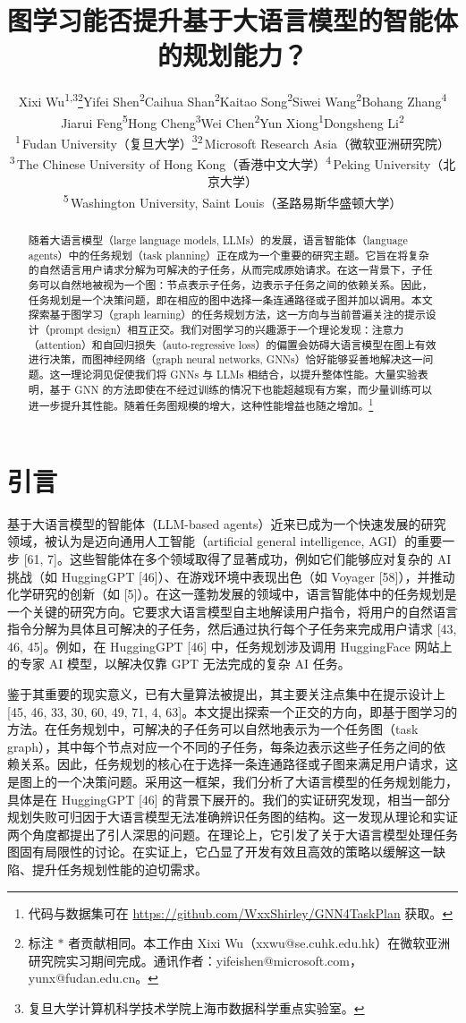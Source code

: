 \documentclass[11pt,UTF8,fontset=fandol]{ctexart}
\title{\textbf{图学习能否提升基于大语言模型的智能体的规划能力？}}
\author{Xixi Wu\textsuperscript{1,3}\thanks{标注 $*$ 者贡献相同。本工作由 Xixi Wu（xxwu@se.cuhk.edu.hk）在微软亚洲研究院实习期间完成。通讯作者：yifeishen@microsoft.com，yunx@fudan.edu.cn。}\quad Yifei Shen\textsuperscript{2}\quad Caihua Shan\textsuperscript{2}\quad Kaitao Song\textsuperscript{2}\quad Siwei Wang\textsuperscript{2}\quad Bohang Zhang\textsuperscript{4}\\
Jiarui Feng\textsuperscript{5}\quad Hong Cheng\textsuperscript{3}\quad Wei Chen\textsuperscript{2}\quad Yun Xiong\textsuperscript{1}\quad Dongsheng Li\textsuperscript{2}\\[0.6em]
\textsuperscript{1}\,Fudan University（复旦大学）\thanks{复旦大学计算机科学技术学院上海市数据科学重点实验室。}\quad \textsuperscript{2}\,Microsoft Research Asia（微软亚洲研究院）\\
\textsuperscript{3}\,The Chinese University of Hong Kong（香港中文大学）\quad \textsuperscript{4}\,Peking University（北京大学）\\
\textsuperscript{5}\,Washington University, Saint Louis（圣路易斯华盛顿大学）}
\date{}
\begin{document}
\maketitle

\begin{abstract}
随着大语言模型（large language models, LLMs）的发展，语言智能体（language agents）中的任务规划（task planning）正在成为一个重要的研究主题。它旨在将复杂的自然语言用户请求分解为可解决的子任务，从而完成原始请求。在这一背景下，子任务可以自然地被视为一个图：节点表示子任务，边表示子任务之间的依赖关系。因此，任务规划是一个决策问题，即在相应的图中选择一条连通路径或子图并加以调用。本文探索基于图学习（graph learning）的任务规划方法，这一方向与当前普遍关注的提示设计（prompt design）相互正交。我们对图学习的兴趣源于一个理论发现：注意力（attention）和自回归损失（auto-regressive loss）的偏置会妨碍大语言模型在图上有效进行决策，而图神经网络（graph neural networks, GNNs）恰好能够妥善地解决这一问题。这一理论洞见促使我们将 GNNs 与 LLMs 相结合，以提升整体性能。大量实验表明，基于 GNN 的方法即使在不经过训练的情况下也能超越现有方案，而少量训练可以进一步提升其性能。随着任务图规模的增大，这种性能增益也随之增加。\footnote{代码与数据集可在 \url{https://github.com/WxxShirley/GNN4TaskPlan} 获取。}
\end{abstract}

\section{引言}

基于大语言模型的智能体（LLM-based agents）近来已成为一个快速发展的研究领域，被认为是迈向通用人工智能（artificial general intelligence, AGI）的重要一步 [61, 7]。这些智能体在多个领域取得了显著成功，例如它们能够应对复杂的 AI 挑战（如 HuggingGPT [46]）、在游戏环境中表现出色（如 Voyager [58]），并推动化学研究的创新（如 [5]）。在这一蓬勃发展的领域中，语言智能体中的任务规划是一个关键的研究方向。它要求大语言模型自主地解读用户指令，将用户的自然语言指令分解为具体且可解决的子任务，然后通过执行每个子任务来完成用户请求 [43, 46, 45]。例如，在 HuggingGPT [46] 中，任务规划涉及调用 HuggingFace 网站上的专家 AI 模型，以解决仅靠 GPT 无法完成的复杂 AI 任务。

鉴于其重要的现实意义，已有大量算法被提出，其主要关注点集中在提示设计上 [45, 46, 33, 30, 60, 49, 71, 4, 63]。本文提出探索一个正交的方向，即基于图学习的方法。在任务规划中，可解决的子任务可以自然地表示为一个任务图（task graph），其中每个节点对应一个不同的子任务，每条边表示这些子任务之间的依赖关系。因此，任务规划的核心在于选择一条连通路径或子图来满足用户请求，这是图上的一个决策问题。采用这一框架，我们分析了大语言模型的任务规划能力，具体是在 HuggingGPT [46] 的背景下展开的。我们的实证研究发现，相当一部分规划失败可归因于大语言模型无法准确辨识任务图的结构。这一发现从理论和实证两个角度都提出了引人深思的问题。在理论上，它引发了关于大语言模型处理任务图固有局限性的讨论。在实证上，它凸显了开发有效且高效的策略以缓解这一缺陷、提升任务规划性能的迫切需求。
\end{document}
